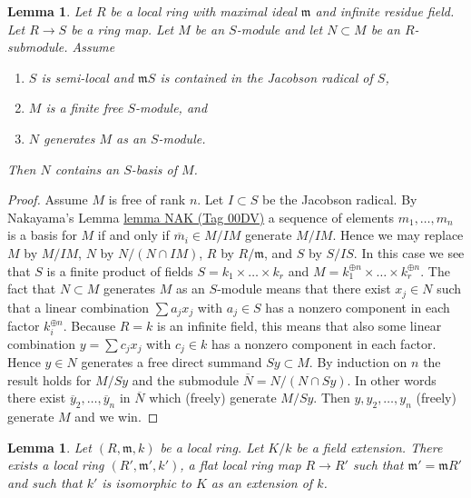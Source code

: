 \documentclass{amsart}
\theoremstyle{plain}
\newtheorem{lemma}[subsection]{Lemma}
\theoremstyle{definition}
\theoremstyle{remark}
\numberwithin{equation}{subsection}
\begin{document}
\begin{lemma}
\label{algebra-lemma-semi-local-module-basis-in-submodule}
Let $R$ be a local ring with maximal ideal $\mathfrak m$ and
infinite residue field.
Let $R \to S$ be a ring map.
Let $M$ be an $S$-module and let $N \subset M$ be an $R$-submodule.
Assume
\begin{enumerate}
\item $S$ is semi-local and $\mathfrak mS$ is contained in the
Jacobson radical of $S$,
\item $M$ is a finite free $S$-module, and
\item $N$ generates $M$ as an $S$-module.
\end{enumerate}
Then $N$ contains an $S$-basis of $M$.
\end{lemma}

\begin{proof}
Assume $M$ is free of rank $n$. Let $I \subset S$ be the Jacobson radical.
By Nakayama's Lemma \href{https://stacks.math.columbia.edu/tag/00DV}{lemma NAK (Tag 00DV)} a sequence of elements
$m_1, \ldots, m_n$ is a basis for $M$ if and only if
$\overline{m}_i \in M/IM$ generate $M/IM$. Hence we may replace
$M$ by $M/IM$, $N$ by $N/(N \cap IM)$, $R$ by $R/\mathfrak m$,
and $S$ by $S/IS$. In this case we see that $S$ is a finite product
of fields $S = k_1 \times \ldots \times k_r$ and
$M = k_1^{\oplus n} \times \ldots \times k_r^{\oplus n}$.
The fact that $N \subset M$ generates $M$ as an $S$-module
means that there exist $x_j \in N$ such that a linear combination
$\sum a_j x_j$ with $a_j \in S$ has a nonzero component in each
factor $k_i^{\oplus n}$.
Because $R = k$ is an infinite field, this means that also
some linear combination $y = \sum c_j x_j$ with $c_j \in k$ has a
nonzero component in each factor. Hence $y \in N$ generates a
free direct summand $Sy \subset M$. By induction on $n$ the result
holds for $M/Sy$ and the submodule $\overline{N} = N/(N \cap Sy)$.
In other words there exist $\overline{y}_2, \ldots, \overline{y}_n$
in $\overline{N}$ which (freely) generate $M/Sy$. Then
$y, y_2, \ldots, y_n$ (freely) generate $M$ and we win.
\end{proof}


\begin{lemma}
\label{algebra-lemma-flat-local-given-residue-field}
Let $(R, \mathfrak m, k)$ be a local ring. Let $K/k$ be a field
extension. There exists a local ring $(R', \mathfrak m', k')$, a flat local
ring map $R \to R'$ such that $\mathfrak m' = \mathfrak mR'$ and such that
$k'$ is isomorphic to $K$ as an extension of $k$.
\end{lemma}
\end{document}
